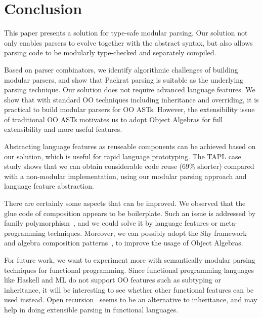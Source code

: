 \section{Conclusion}\label{sec:conclusion}

This paper presents a solution for type-safe modular parsing. Our solution 
not only enables parsers to evolve together with the abstract syntax, 
but also allows parsing code to be modularly type-checked and separately compiled.

Based on parser combinators, we identify algorithmic
challenges of building modular parsers, and show that Packrat parsing
is suitable as the underlying parsing technique. Our solution does not
require advanced language features. We show that with standard OO
techniques including inheritance and overriding, it is practical to
build modular parsers for OO ASTs. However, the extensibility issue of
traditional OO ASTs motivates us to adopt Object Algebras for full
extensibility and more useful features.

Abstracting language features as reuseable components can be achieved
based on our solution, which is useful for rapid language prototyping.
The TAPL case study shows that we can obtain considerable code reuse
(69\% shorter) compared with a non-modular implementation, using our
modular parsing approach and language feature abstraction.

There are certainly some aspects that can be improved. We observed that the
glue code of composition appears to be boilerplate. Such an issue
is addressed by family polymorphism~\cite{ernst01FP}, and we could solve it by language
features or meta-programming techniques. Moreover, we can possibly
adopt the Shy framework~\cite{Zhang2015} and algebra composition
patterns~\cite{oliveira2013feature}, to improve the usage of Object
Algebras.

For future work, we want to experiment more with semantically modular
parsing techniques for functional programming. Since functional
programming languages like Haskell and ML do not support OO features 
such as subtyping or inheritance, it will be interesting to see
whether other functional features can be used instead. 
Open recursion~\cite{CookThesis} seems to be an alternative to inheritance, and may 
help in doing extensible parsing in functional languages. 
